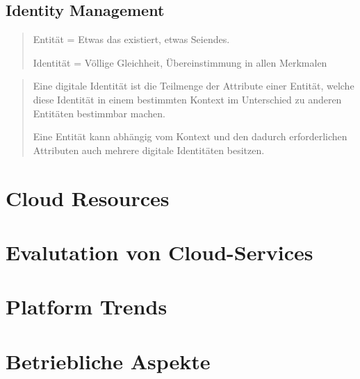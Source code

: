 \documentclass[a4paper, 11pt]{article}
\begin{document}
\subsection{Identity Management}
\blockquote{Entität = Etwas das existiert, etwas Seiendes.
	
	Identität = Völlige Gleichheit, Übereinstimmung in allen Merkmalen}

\blockquote{Eine digitale Identität ist die Teilmenge der Attribute einer Entität, welche diese Identität in einem bestimmten Kontext im Unterschied zu anderen Entitäten bestimmbar machen.

Eine Entität kann abhängig vom Kontext und den dadurch erforderlichen Attributen auch mehrere digitale Identitäten besitzen.}


\section{Cloud Resources}

\section{Evalutation von Cloud-Services}

\section{Platform Trends}

\section{Betriebliche Aspekte}
\end{document}

